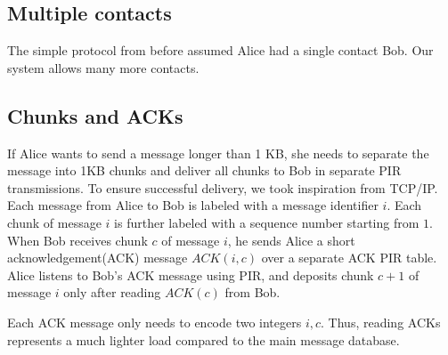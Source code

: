 \subsection{Multiple contacts}

The simple protocol from before assumed Alice had a single contact Bob. Our system allows many more contacts. 

\subsection{Chunks and ACKs}

If Alice wants to send a message longer than 1 KB, she needs to separate the message into 1KB chunks and deliver all chunks to Bob in separate PIR transmissions. To ensure successful delivery, we took inspiration from TCP/IP. Each message from Alice to Bob is labeled with a message identifier $i$. Each chunk of message $i$ is further labeled with a sequence number starting from $1$. When Bob receives chunk $c$ of message $i$, he sends Alice a short acknowledgement(ACK) message $ACK(i, c)$ over a separate ACK PIR table. Alice listens to Bob's ACK message using PIR, and deposits chunk $c + 1$ of message $i$ only after reading $ACK(c)$ from Bob.

Each ACK message only needs to encode two integers $i, c$. Thus, reading ACKs represents a much lighter load compared to the main message database.


